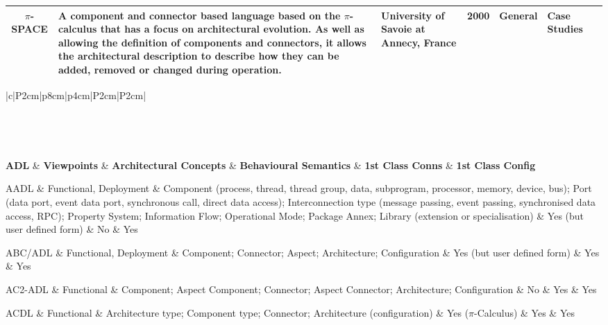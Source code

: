 \begin{landscape}
\begin{longtable}{|c|p{6cm}|p{3cm}|c|p{3cm}|p{2cm}|c|}
\hline
$\pi$-SPACE & A component and connector based language based on the $\pi$-calculus that has a focus on architectural evolution. As well as allowing the definition of components and connectors, it allows the architectural description to describe how they can be added, removed or changed during operation. & University of Savoie at Annecy, France & 2000 & General & Case Studies & \cite{chaudet2000-pispace} \\
\hline

\end{longtable}
\end{landscape}

\begin{landscape}
\footnotesize
\begin{longtable}{|c|P{2cm}|p{8cm}|p{4cm}|P{2cm}|P{2cm}|} 
\label{table:adl-concepts} \\
\caption{ADL Support for Architectural Concepts} \\
\endfirsthead
\caption[]{ADL Support for Architectural Concepts} \\
\endhead
\hline

\textbf{ADL} & \textbf{Viewpoints} & \textbf{Architectural Concepts} & \textbf{ Behavioural Semantics} & \textbf{1st Class Conns} & \textbf{1st Class Config} 
\endhead
\hline

AADL & Functional, Deployment & Component (process, thread, thread group, data, subprogram, processor, memory, device, bus); Port (data port, event data port, synchronous call, direct data access); Interconnection type (message passing, event passing, synchronised data access, RPC); Property System; Information Flow; Operational Mode; Package Annex; Library (extension or specialisation) & Yes (but user defined form) & No & Yes \\
\hline

ABC/ADL & Functional, Deployment & Component; Connector; Aspect; Architecture; Configuration & Yes (but user defined form) & Yes & Yes \\
\hline

AC2-ADL & Functional & Component; Aspect Component; Connector; Aspect Connector; Architecture; Configuration & No & Yes & Yes \\

\hline

ACDL & Functional & Architecture type; Component type; Connector; Architecture (configuration) & Yes ($\pi$-Calculus) & Yes & Yes \\ 
\hline


\end{longtable}
\end{landscape}
